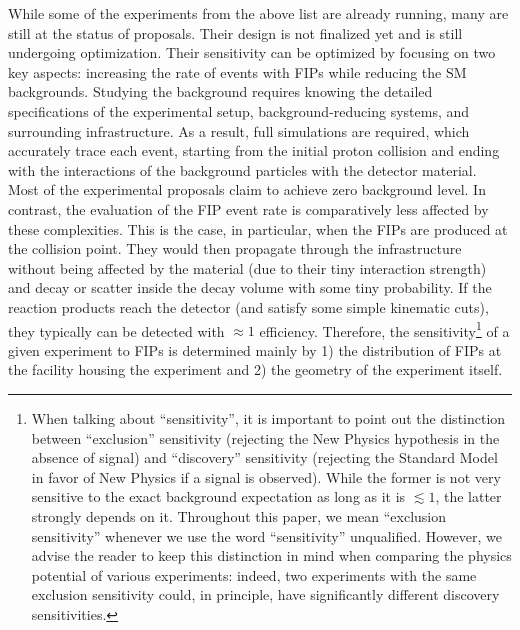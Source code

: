 \documentclass[
    aps,prd,
    twocolumn,
    nofootinbib,
    superscriptaddress,
]{revtex4}
\begin{document}
While some of the experiments from the above list are already running, many are still at the status of proposals. Their design is not finalized yet and is still undergoing optimization. Their sensitivity can be optimized by focusing on two key aspects: increasing the rate of events with FIPs while reducing the SM backgrounds. Studying the background requires knowing the detailed specifications of the experimental setup, background-reducing systems, and surrounding infrastructure. As a result, full simulations are required, which accurately trace each event, starting from the initial proton collision and ending with the interactions of the background particles with the detector material. Most of the experimental proposals claim to achieve zero background level. In contrast, the evaluation of the FIP event rate is comparatively less affected by these complexities. This is the case, in particular, when the FIPs are produced at the collision point. They would then propagate through the infrastructure without being affected by the material (due to their tiny interaction strength) and decay or scatter inside the decay volume with some tiny probability. If the reaction products reach the detector (and satisfy some simple kinematic cuts), they typically can be detected with $\approx 1$ efficiency. Therefore, the sensitivity\footnote{When talking about ``sensitivity'', it is important to point out the distinction between ``exclusion'' sensitivity (rejecting the New Physics hypothesis in the absence of signal) and ``discovery'' sensitivity (rejecting the Standard Model in favor of New Physics if a signal is observed). While the former is not very sensitive to the exact background expectation as long as it is $\lesssim 1$, the latter strongly depends on it. Throughout this paper, we mean ``exclusion sensitivity'' whenever we use the word ``sensitivity'' unqualified. However, we advise the reader to keep this distinction in mind when comparing the physics potential of various experiments: indeed, two experiments with the same exclusion sensitivity could, in principle, have significantly different discovery sensitivities.} of a given experiment to FIPs is determined mainly by 1) the distribution of FIPs at the facility housing the experiment and 2) the geometry of the experiment itself.
\end{document}
